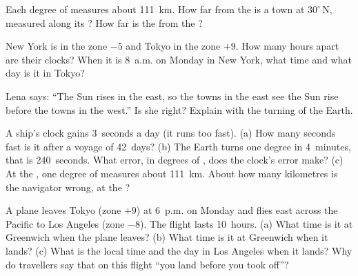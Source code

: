 \begin{exercise}[$\star\star$]\label{exo:g6:latitude-longitude:8}
Each degree of  measures about \qty{111}{km}. How far from the
 is a town at $30^\circ$\,N, measured along its ? How far is
the  from the ?
\end{exercise}

\begin{exercise}[$\star\star$]\label{exo:g6:latitude-longitude:9}
New York is in the zone $-5$ and Tokyo in the zone $+9$. How many hours
apart are their clocks? When it is 8~a.m. on Monday in New York, what time
and what day is it in Tokyo?
\end{exercise}

\begin{exercise}[$\star\star$]\label{exo:g6:latitude-longitude:10}
Lena says: ``The Sun rises in the east, so the towns in the east see the
Sun rise before the towns in the west.'' Is she right? Explain with the
turning of the Earth.
\end{exercise}

\begin{exercise}[$\star\star\star$]\label{exo:g6:latitude-longitude:11}
A ship's clock gains 3~seconds a day (it runs too fast). (a) How many
seconds fast is it after a voyage of 42~days? (b) The Earth turns one
degree in 4~minutes, that is 240~seconds. What error, in degrees of
, does the clock's error make? (c) At the , one degree of
 measures about \qty{111}{km}. About how many kilometres is the
navigator wrong, at the ?
\end{exercise}

\begin{exercise}[$\star\star\star$]\label{exo:g6:latitude-longitude:12}
A plane leaves Tokyo (zone $+9$) at 6~p.m. on Monday and flies east across
the Pacific to Los Angeles (zone $-8$). The flight lasts 10~hours. (a) What
time is it at Greenwich when the plane leaves? (b) What time is it at
Greenwich when it lands? (c) What is the local time and the day in Los
Angeles when it lands? Why do travellers say that on this flight ``you land
before you took off''?
\end{exercise}

